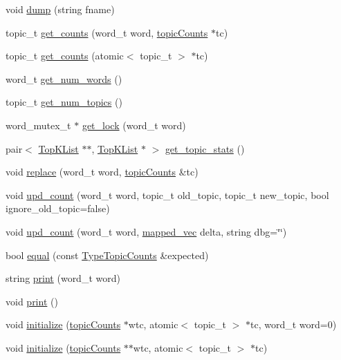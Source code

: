 \begin{DoxyCompactItemize}
void \hyperlink{class_type_topic_counts_ad5b4a0efaccdf397d696ef3a59ff5bc5}{dump} (string fname)
\item 
topic\_\-t \hyperlink{class_type_topic_counts_af6811be58a729eed6909236f0c22c554}{get\_\-counts} (word\_\-t word, \hyperlink{struct_topic_counts}{topicCounts} $\ast$tc)
\item 
topic\_\-t \hyperlink{class_type_topic_counts_a8fe14c5595b71fd856197e198ea67196}{get\_\-counts} (atomic$<$ topic\_\-t $>$ $\ast$tc)
\item 
word\_\-t \hyperlink{class_type_topic_counts_a18f351c45c28ebc4be0f0d3df001fde4}{get\_\-num\_\-words} ()
\item 
topic\_\-t \hyperlink{class_type_topic_counts_a443c1fcce5b88993cea9891137f9f5fa}{get\_\-num\_\-topics} ()
\item 
word\_\-mutex\_\-t $\ast$ \hyperlink{class_type_topic_counts_a109fdf5a24f0dc898d828e5ebe55e34f}{get\_\-lock} (word\_\-t word)
\item 
pair$<$ \hyperlink{class_top_k_list}{TopKList} $\ast$$\ast$, \hyperlink{class_top_k_list}{TopKList} $\ast$ $>$ \hyperlink{class_type_topic_counts_a0a41df650f7c2975f7517d02deb6d868}{get\_\-topic\_\-stats} ()
\item 
void \hyperlink{class_type_topic_counts_a8d29734547e3cbe1936282967b62c9e7}{replace} (word\_\-t word, \hyperlink{struct_topic_counts}{topicCounts} \&tc)
\item 
void \hyperlink{class_type_topic_counts_a6ccff3b11d661503a45bc382411af9ad}{upd\_\-count} (word\_\-t word, topic\_\-t old\_\-topic, topic\_\-t new\_\-topic, bool ignore\_\-old\_\-topic=false)
\item 
void \hyperlink{class_type_topic_counts_a4cdeb79b31cc51bf74b0cf2824aad62d}{upd\_\-count} (word\_\-t word, \hyperlink{types_8h_a4fed6ff282eca8f2c6ebdb4bc2e99e8b}{mapped\_\-vec} delta, string dbg=\char`\"{}\char`\"{})
\item 
bool \hyperlink{class_type_topic_counts_aca203c070ed5c7338ebfe7b2b2574ae4}{equal} (const \hyperlink{class_type_topic_counts}{TypeTopicCounts} \&expected)
\item 
string \hyperlink{class_type_topic_counts_a8aecfbf940bbc235954488ef3d107075}{print} (word\_\-t word)
\item 
void \hyperlink{class_type_topic_counts_a126d74c21ec8eda16a875711b9879f86}{print} ()
\item 
void \hyperlink{class_type_topic_counts_a0f6527f9f996e4e39859a6cb266ebf12}{initialize} (\hyperlink{struct_topic_counts}{topicCounts} $\ast$wtc, atomic$<$ topic\_\-t $>$ $\ast$tc, word\_\-t word=0)
\item 
void \hyperlink{class_type_topic_counts_ab788633dc25d325dc47bd333b87ae574}{initialize} (\hyperlink{struct_topic_counts}{topicCounts} $\ast$$\ast$wtc, atomic$<$ topic\_\-t $>$ $\ast$tc)
\end{DoxyCompactItemize}
